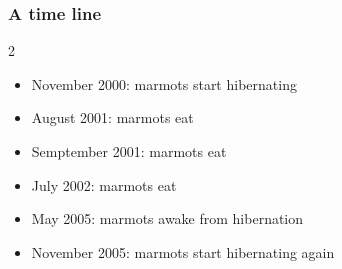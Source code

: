 \documentclass{beamer}
\begin{document}
\begin{frame}[t]
	\frametitle{A time line}
	\begin{multicols}{2}
		\begin{itemize}
			\item<1-> November 2000: marmots start hibernating
			\item<2-> August 2001: marmots eat
			\item<2-> Semptember 2001: marmots eat
			\item<3-> July 2002: marmots eat
			\item<4-> May 2005: marmots awake from hibernation
			\item<4-> November 2005: marmots start hibernating again
		\end{itemize}
	\end{multicols}
\end{frame}
\end{document}
